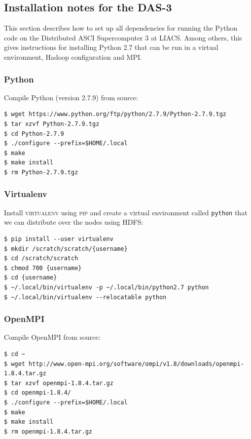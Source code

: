 \documentclass{article}
\begin{document}
\subsection{Installation notes for the DAS-3}\label{app:installation-notes}
This section describes how to set up all dependencies for running the Python
code on the Distributed ASCI Supercomputer 3 at LIACS\@. Among others, this
gives instructions for installing Python 2.7 that can be run in a virtual
environment, Hadoop configuration and MPI.

\subsubsection{Python}\label{app:python}
Compile Python (version 2.7.9) from source:

\begin{verbatim}
$ wget https://www.python.org/ftp/python/2.7.9/Python-2.7.9.tgz
$ tar xzvf Python-2.7.9.tgz
$ cd Python-2.7.9
$ ./configure --prefix=$HOME/.local
$ make
$ make install
$ rm Python-2.7.9.tgz
\end{verbatim}

\subsubsection{Virtualenv}\label{app:virtualenv}

Install \textsc{virtualenv} using \textsc{pip} and create a virtual environment 
called \texttt{python} that we can distribute over the nodes using HDFS:

\begin{verbatim}
$ pip install --user virtualenv
$ mkdir /scratch/scratch/{username}
$ cd /scratch/scratch
$ chmod 700 {username}
$ cd {username}
$ ~/.local/bin/virtualenv -p ~/.local/bin/python2.7 python
$ ~/.local/bin/virtualenv --relocatable python
\end{verbatim}

\subsubsection{OpenMPI}\label{app:openmpi}
Compile OpenMPI from source:

\begin{verbatim}
$ cd ~
$ wget http://www.open-mpi.org/software/ompi/v1.8/downloads/openmpi-1.8.4.tar.gz
$ tar xzvf openmpi-1.8.4.tar.gz
$ cd openmpi-1.8.4/
$ ./configure --prefix=$HOME/.local
$ make
$ make install
$ rm openmpi-1.8.4.tar.gz
\end{verbatim}
\end{document}
